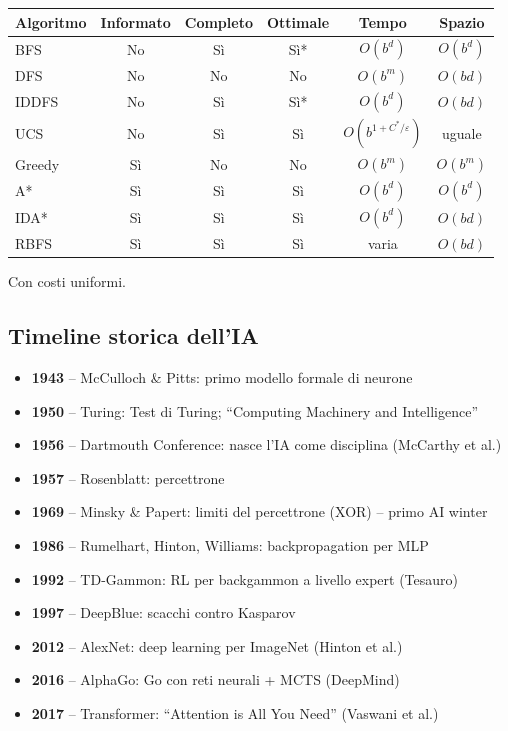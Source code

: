\documentclass[12pt,a4paper]{article}
\begin{document}
\begin{center}
\renewcommand{\arraystretch}{1.2}
\begin{tabular}{lccccc}
\toprule
\textbf{Algoritmo} & \textbf{Informato} & \textbf{Completo} & \textbf{Ottimale} & \textbf{Tempo} & \textbf{Spazio} \\
\midrule
BFS & No & Sì & Sì* & $O(b^d)$ & $O(b^d)$ \\
DFS & No & No & No & $O(b^m)$ & $O(bd)$ \\
IDDFS & No & Sì & Sì* & $O(b^d)$ & $O(bd)$ \\
UCS & No & Sì & Sì & $O(b^{1+C^*/\varepsilon})$ & uguale \\
Greedy & Sì & No & No & $O(b^m)$ & $O(b^m)$ \\
A* & Sì & Sì & Sì & $O(b^d)$ & $O(b^d)$ \\
IDA* & Sì & Sì & Sì & $O(b^d)$ & $O(bd)$ \\
RBFS & Sì & Sì & Sì & varia & $O(bd)$ \\
\bottomrule
\end{tabular}
\end{center}
{\small *Con costi uniformi.}

\subsection{Timeline storica dell'IA}

\begin{itemize}[noitemsep]
  \item \textbf{1943} -- McCulloch \& Pitts: primo modello formale di neurone
  \item \textbf{1950} -- Turing: Test di Turing; ``Computing Machinery and Intelligence''
  \item \textbf{1956} -- Dartmouth Conference: nasce l'IA come disciplina (McCarthy et al.)
  \item \textbf{1957} -- Rosenblatt: percettrone
  \item \textbf{1969} -- Minsky \& Papert: limiti del percettrone (XOR) -- primo AI winter
  \item \textbf{1986} -- Rumelhart, Hinton, Williams: backpropagation per MLP
  \item \textbf{1992} -- TD-Gammon: RL per backgammon a livello expert (Tesauro)
  \item \textbf{1997} -- DeepBlue: scacchi contro Kasparov
  \item \textbf{2012} -- AlexNet: deep learning per ImageNet (Hinton et al.)
  \item \textbf{2016} -- AlphaGo: Go con reti neurali + MCTS (DeepMind)
  \item \textbf{2017} -- Transformer: ``Attention is All You Need'' (Vaswani et al.)
\end{itemize}
\end{document}
